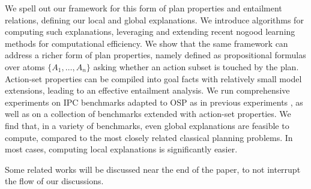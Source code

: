 We spell out our framework for this form of plan properties and
entailment relations, defining our local and global explanations. We
introduce algorithms for computing such explanations, leveraging and
extending recent nogood learning methods
\cite{steinmetz:hoffmann:ai-17,steinmetz:hoffmann:ijcai-17} for
computational efficiency. We show that the same framework can address
a richer form of plan properties, namely 
defined as propositional formulas over atoms $\{A_1, \dots, A_n\}$
asking whether an action subset is touched by the plan. Action-set
properties can be compiled into goal facts with relatively small model
extensions, leading to an effective entailment analysis. We run
comprehensive experiments on IPC benchmarks adapted to OSP as in
previous experiments \cite{domshlak:mirkis:jair-15}, as well as on a
collection of benchmarks extended with action-set properties. We find
that, in a variety of benchmarks, even global explanations are
feasible to compute, compared to the most closely related classical
planning problems. In most cases, computing local explanations is
significantly easier.



Some related works will be discussed near the end of the paper, to not
interrupt the flow of our discussions.



















